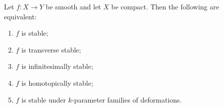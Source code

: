 Let $f: X \rightarrow Y$ be smooth and let $X$ be compact. Then the following are equivalent:

\begin{enumerate}
\item[(a)] $f$ is stable;
\item[(b)] $f$ is transverse stable;
\item[(c)] $f$ is infinitesimally stable;
\item[(d)] $f$ is homotopically stable;
\item[(e)] $f$ is stable under $k$-parameter families of deformations.
\end{enumerate}
